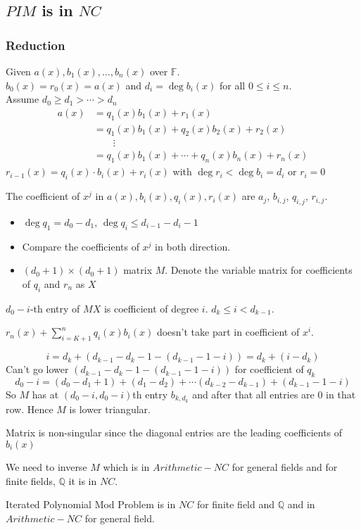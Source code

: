 \documentclass[article,10pt]{beamer}%
\newcommand{\bbF}{\mathbb{F}}
\begin{document}
\subsection{$PIM$ is in $NC$}
\begin{frame}[allowframebreaks]
	\frametitle{Reduction}
	Given $a(x),b_1(x),\dots, b_n(x)$ over $\bbF$.\\
	$b_0(x)=r_0(x)=a(x)$ and $d_i=\deg b_i(x)$ for all $0\leq i\leq n$.\\
	 Assume $d_0\geq d_1> \cdots > d_n$
	 \begin{align*}
	 	a(x) & = q_1(x)b_1(x)+r_1(x)\\
	 	& = q_1(x)b_1(x)+q_2(x)b_2(x)+r_2(x)\\
	 	& \qquad \vdots\\
	 	& = q_1(x)b_1(x)+\cdots+q_n(x)b_n(x)+r_n(x)
	 \end{align*}
	 $r_{i-1}(x)=q_i(x)\cdot b_i(x)+r_i(x)$ with 	 $	\deg r_i<\deg b_i=d_i$ or $r_i=0$ 
	\framebreak
	
	The coefficient of $x^j$ in $a(x), b_i(x), q_i(x), r_i(x)$ are $a_j$, $b_{i,j}$, $q_{i,j}$, $ r_{i,j}$. 
	\begin{itemize}
		\item $\deg q_1=d_0-d_1$, $\deg q_i\leq d_{i-1}-d_{i}-1$
		\item Compare the coefficients of $x^j$ in both direction.
		\item $(d_0+1)\times (d_0+1)$  matrix $M$. Denote the variable matrix for coefficients of $q_i$ and $r_n$ as $X$
	\end{itemize}\framebreak
	
 $d_0-i$-th entry of $MX$ is coefficient of  degree $i$. $d_{k}\leq i<d_{k-1}$. 
 
 $r_n(x)+\sum\limits_{i=K+1}^nq_i(x)b_i(x)$ doesn't take part in coefficient of $x^i$.
 
 $$i=d_k +  (d_{k-1}-d_{k}-1-(d_{k-1}-1-i))=d_k + (i-d_{k})$$Can't go lower  $(d_{k-1}-d_{k}-1-(d_{k-1}-1-i))$ for coefficient of $q_k$
 $$d_0-i=(d_0-d_1+1)+(d_1-d_2)+\cdots (d_{k-2}-d_{k-1})+(d_{k-1}-1-i)$$
 So $M$ has at $(d_0-i,d_0-i)$th entry $b_{k,d_k}$ and after that all entries are 0 in that row. Hence $M$ is lower triangular.\vspace{2mm}
 
Matrix is non-singular since the diagonal entries are the leading coefficients of $b_i(x)$ \framebreak


We need to inverse $M$ which is in $Arithmetic-NC$ for general fields and for finite fields, $\mathbb{Q}$ it is in $NC$. \vspace{5mm}

\begin{theorem}
	Iterated Polynomial Mod Problem is in $NC$ for finite field and $\mathbb{Q}$ and in $Arithmetic-NC$ for general field.
\end{theorem}
	
\end{frame}
\end{document}
